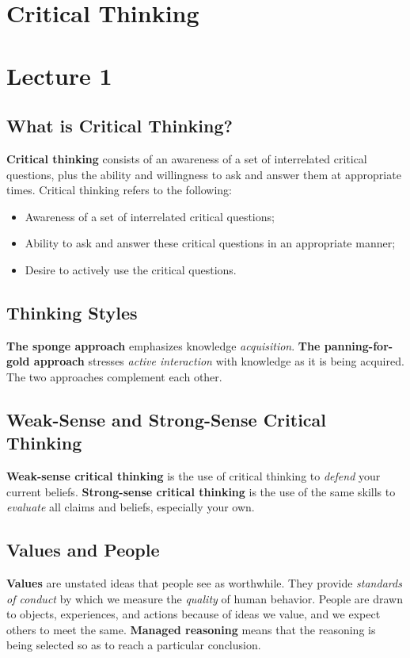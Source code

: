 \documentclass{article}
\begin{document}
\section*{Critical Thinking}

\section{Lecture 1}

\subsection{What is Critical Thinking?}
\textbf{Critical thinking} consists of an awareness of a set of interrelated critical questions, plus the ability and willingness to ask and answer them at appropriate times. Critical thinking refers to the following:
\begin{itemize}
  \item Awareness of a set of interrelated critical questions;
  \item Ability to ask and answer these critical questions in an appropriate manner;
  \item Desire to actively use the critical questions.
\end{itemize}

\subsection{Thinking Styles}
\textbf{The sponge approach} emphasizes knowledge \emph{acquisition}. \textbf{The panning-for-gold approach} stresses \emph{active interaction} with knowledge as it is being acquired. The two approaches complement each other.

\subsection{Weak-Sense and Strong-Sense Critical Thinking}
\textbf{Weak-sense critical thinking} is the use of critical thinking to \emph{defend} your current beliefs.
\textbf{Strong-sense critical thinking} is the use of the same skills to \emph{evaluate} all claims and beliefs, especially your own.

\subsection{Values and People}
\textbf{Values} are unstated ideas that people see as worthwhile. They provide \emph{standards of conduct} by which we measure the \emph{quality} of human behavior. People are drawn to objects, experiences, and actions because of ideas we value, and we expect others to meet the same. \textbf{Managed reasoning} means that the reasoning is being selected so as to reach a particular conclusion.
\end{document}
